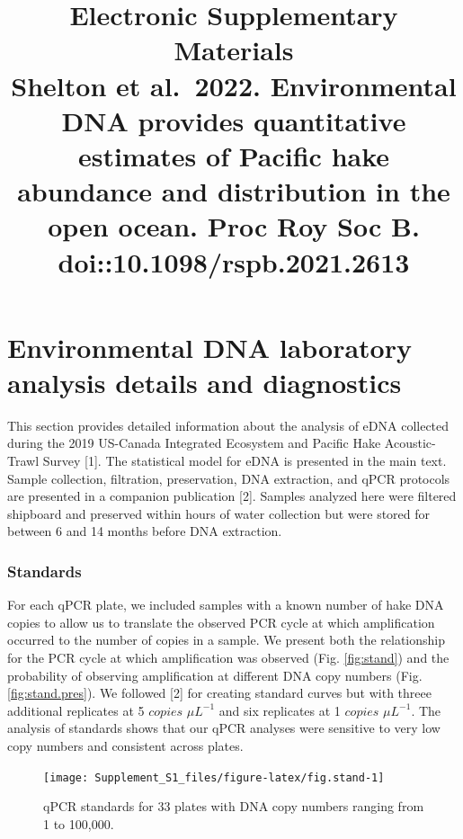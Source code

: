 \documentclass[
]{article}
\title{ Electronic Supplementary Materials \\
\large Shelton et al.~2022. Environmental DNA provides quantitative estimates of Pacific hake
abundance and distribution in the open ocean. 
Proc Roy Soc B.
doi::10.1098/rspb.2021.2613}
\author{}
\date{\vspace{-2.5em}}
\begin{document}
\maketitle

{
\setcounter{tocdepth}{2}
\tableofcontents
}
\renewcommand{\thefigure}{S\arabic{figure}}
\setcounter{figure}{0}

\renewcommand{\thetable}{S\arabic{table}}
\setcounter{table}{0}

\clearpage

\hypertarget{environmental-dna-laboratory-analysis-details-and-diagnostics}{%
\section{Environmental DNA laboratory analysis details and
diagnostics}\label{environmental-dna-laboratory-analysis-details-and-diagnostics}}

This section provides detailed information about the analysis of eDNA
collected during the 2019 US-Canada Integrated Ecosystem and Pacific
Hake Acoustic-Trawl Survey {[}1{]}. The statistical model for eDNA is
presented in the main text. Sample collection, filtration, preservation,
DNA extraction, and qPCR protocols are presented in a companion
publication {[}2{]}. Samples analyzed here were filtered shipboard and
preserved within hours of water collection but were stored for between 6
and 14 months before DNA extraction.

\hypertarget{standards}{%
\subsubsection{Standards}\label{standards}}

For each qPCR plate, we included samples with a known number of hake DNA
copies to allow us to translate the observed PCR cycle at which
amplification occurred to the number of copies in a sample. We present
both the relationship for the PCR cycle at which amplification was
observed (Fig. \ref{fig:stand}) and the probability of observing
amplification at different DNA copy numbers (Fig. \ref{fig:stand.pres}).
We followed {[}2{]} for creating standard curves but with threee
additional replicates at 5 \(copies\) \(\mu L^{-1}\) and six replicates
at 1 \(copies\) \(\mu L^{-1}\). The analysis of standards shows that our
qPCR analyses were sensitive to very low copy numbers and consistent
across plates.

\begin{figure}
\texttt{[image: Supplement\_S1\_files/figure-latex/fig.stand-1]} \caption{\label{fig:stand} qPCR standards for 33 plates with DNA copy numbers ranging from 1 to 100,000.}\label{fig:fig.stand}
\end{figure}
\end{document}
